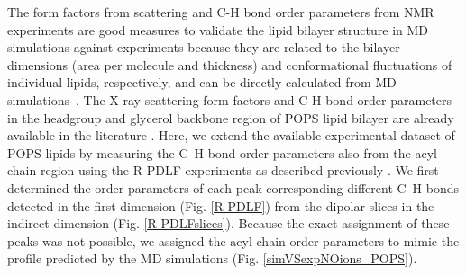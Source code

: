 \documentclass[journal=jpcbfk,manuscript=article]{achemso}
\begin{document}
The form factors from scattering and C-H bond order parameters from NMR experiments are good measures to validate
the lipid bilayer structure in MD simulations against experiments because they
are related to the bilayer dimensions (area per molecule and thickness) and
conformational fluctuations of individual lipids, respectively, and 
can be directly calculated from MD simulations~\cite{ollila16}.
The X-ray scattering form factors and C-H bond order parameters in
the headgroup and glycerol backbone region of POPS lipid bilayer are already available in the literature \cite{pan14,nmrlipids_proj4}.
Here, we extend the available experimental dataset of POPS lipids by measuring the C--H bond
order parameters also from the acyl chain region using the R-PDLF experiments as described previously \cite{ferreira13}.
We first determined the order parameters of each peak corresponding different C--H bonds detected
in the first dimension (Fig. \ref{R-PDLF}) from the dipolar slices in the indirect dimension (Fig. \ref{R-PDLFslices}).
Because the exact assignment of these peaks was not possible, we assigned the
acyl chain order parameters to mimic the profile predicted by the MD simulations (Fig. \ref{simVSexpNOions_POPS}).
\end{document}
